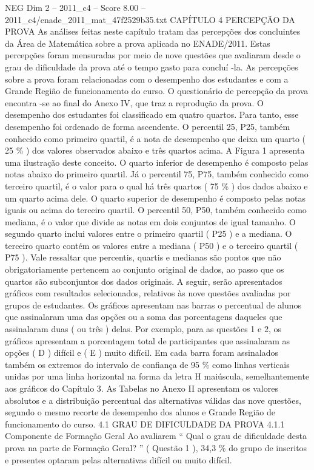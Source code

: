 \begin{textsample}{NEG Dim 2 – 2011\_c4 – Score 8.00 – 2011\_c4/enade\_2011\_mat\_47f2529b35.txt}  \label{ex:f2_neg_312}
CAPÍTULO 4 PERCEPÇÃO DA PROVA As análises feitas neste capítulo tratam das percepções dos concluintes da Área de Matemática sobre a prova aplicada no ENADE/2011.
Estas percepções foram mensuradas por meio de nove questões que avaliaram desde o grau de dificuldade da prova até o tempo gasto para concluí -la.
As percepções sobre a prova foram relacionadas com o desempenho dos estudantes e com a Grande Região de funcionamento do curso.
O questionário de percepção da prova encontra -se ao final do Anexo IV, que traz a reprodução da prova.
O desempenho dos estudantes foi classificado em quatro quartos.
Para tanto, esse desempenho foi ordenado de forma ascendente.
O percentil 25, P25, também conhecido como primeiro quartil, é a nota de desempenho que deixa um quarto ( 25 \% ) dos valores observados abaixo e três quartos acima.
A Figura 1 apresenta uma ilustração deste conceito.
O quarto inferior de desempenho é composto pelas notas abaixo do primeiro quartil.
Já o percentil 75, P75, também conhecido como terceiro quartil, é o valor para o qual há três quartos ( 75 \% ) dos dados abaixo e um quarto acima dele.
O quarto superior de desempenho é composto pelas notas iguais ou acima do terceiro quartil.
O percentil 50, P50, também conhecido como mediana, é o valor que divide as notas em dois conjuntos de igual tamanho.
O segundo quarto inclui valores entre o primeiro quartil ( P25 ) e a mediana.
O terceiro quarto contém os valores entre a mediana ( P50 ) e o terceiro quartil ( P75 ).
Vale ressaltar que percentis, quartis e medianas são pontos que não obrigatoriamente pertencem ao conjunto original de dados, ao passo que os quartos são subconjuntos dos dados originais.
A seguir, serão apresentados gráficos com resultados selecionados, relativos às nove questões avaliadas por grupos de estudantes.
Os gráficos apresentam nas barras o percentual de alunos que assinalaram uma das opções ou a soma das porcentagens daqueles que assinalaram duas ( ou três ) delas.
Por exemplo, para as questões 1 e 2, os gráficos apresentam a porcentagem total de participantes que assinalaram as opções ( D ) difícil e ( E ) muito difícil.
Em cada barra foram assinalados também os extremos do intervalo de confiança de 95 \% como linhas verticais unidas por uma linha horizontal na forma da letra H maiúscula, semelhantemente aos gráficos do Capítulo 3.
As Tabelas no Anexo II apresentam os valores absolutos e a distribuição percentual das alternativas válidas das nove questões, segundo o mesmo recorte de desempenho dos alunos e Grande Região de funcionamento do curso. 4.1 GRAU DE DIFICULDADE DA PROVA 4.1.1 Componente de Formação Geral Ao avaliarem “ Qual o grau de dificuldade desta prova na parte de Formação Geral? ” ( Questão 1 ), 34,3 \% do grupo de inscritos e presentes optaram pelas alternativas difícil ou muito difícil.

\end{textsample}
